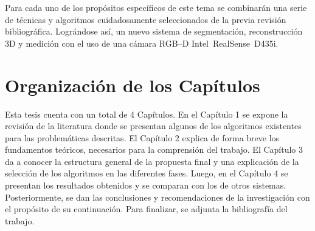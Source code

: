Para cada uno de los propósitos específicos de este tema se combinarán una serie de técnicas y algoritmos cuidadosamente seleccionados de la previa revisión bibliográfica. Lográndose así, un nuevo sistema de segmentación, reconstrucción 3D y medición con el uso de una cámara RGB–D Intel\textregistered~RealSense\texttrademark~D435i.

\section*{Organización de los Capítulos}

Esta tesis cuenta con un total de 4 Capítulos. En el Capítulo 1 se expone la revisión de la literatura donde se presentan algunos de los algoritmos existentes para las problemáticas descritas. El Capítulo 2 explica de forma breve los fundamentos teóricos, necesarios para la comprensión del trabajo. El Capítulo 3 da a conocer la estructura general de la propuesta final y una explicación de la selección de los algoritmos en las diferentes fases. Luego, en el Capítulo 4 se presentan los resultados obtenidos y se comparan con los de otros sistemas. Posteriormente, se dan las conclusiones y recomendaciones de la investigación con el propósito de su continuación. Para finalizar, se adjunta la bibliografía del trabajo.
